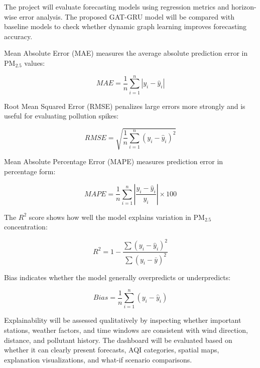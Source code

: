 The project will evaluate forecasting models using regression metrics and horizon-wise error analysis. The proposed GAT-GRU model will be compared with baseline models to check whether dynamic graph learning improves forecasting accuracy.

Mean Absolute Error (MAE) measures the average absolute prediction error in PM$_{2.5}$ values:

\begin{equation}
MAE = \frac{1}{n} \sum_{i=1}^{n} |y_i - \hat{y}_i|
\end{equation}

Root Mean Squared Error (RMSE) penalizes large errors more strongly and is useful for evaluating pollution spikes:

\begin{equation}
RMSE = \sqrt{\frac{1}{n} \sum_{i=1}^{n} (y_i - \hat{y}_i)^2}
\end{equation}

Mean Absolute Percentage Error (MAPE) measures prediction error in percentage form:

\begin{equation}
MAPE = \frac{1}{n} \sum_{i=1}^{n} \left|\frac{y_i - \hat{y}_i}{y_i}\right| \times 100
\end{equation}

The $R^2$ score shows how well the model explains variation in PM$_{2.5}$ concentration:

\begin{equation}
R^2 = 1 - \frac{\sum (y_i - \hat{y}_i)^2}{\sum (y_i - \bar{y})^2}
\end{equation}

Bias indicates whether the model generally overpredicts or underpredicts:

\begin{equation}
Bias = \frac{1}{n} \sum_{i=1}^{n} (y_i - \hat{y}_i)
\end{equation}


Explainability will be assessed qualitatively by inspecting whether important stations, weather factors, and time windows are consistent with wind direction, distance, and pollutant history. The dashboard will be evaluated based on whether it can clearly present forecasts, AQI categories, spatial maps, explanation visualizations, and what-if scenario comparisons.
